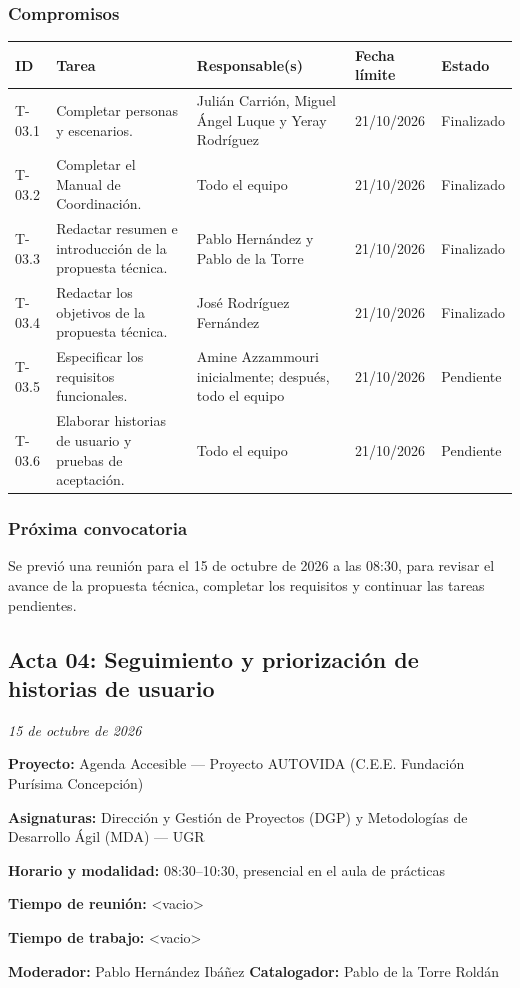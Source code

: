\subsubsection{Compromisos}
\begin{center}\footnotesize
\begin{tabularx}{\textwidth}{@{}p{}X p{}p{}p{}@{}}
\toprule
\rowcolor{tableHeader} ID & Tarea & Responsable(s) & Fecha límite & Estado \\
\midrule
T-03.1 & Completar personas y escenarios. & Julián Carrión, Miguel Ángel Luque y Yeray Rodríguez & 21/10/2026 & Finalizado \\
T-03.2 & Completar el Manual de Coordinación. & Todo el equipo & 21/10/2026 & Finalizado \\
T-03.3 & Redactar resumen e introducción de la propuesta técnica. & Pablo Hernández y Pablo de la Torre & 21/10/2026 & Finalizado \\
T-03.4 & Redactar los objetivos de la propuesta técnica. & José Rodríguez Fernández & 21/10/2026 & Finalizado \\
T-03.5 & Especificar los requisitos funcionales. & Amine Azzammouri inicialmente; después, todo el equipo & 21/10/2026 & Pendiente \\
T-03.6 & Elaborar historias de usuario y pruebas de aceptación. & Todo el equipo & 21/10/2026 & Pendiente \\
\bottomrule
\end{tabularx}
\end{center}

\subsubsection{Próxima convocatoria}
Se previó una reunión para el 15 de octubre de 2026 a las 08:30, para revisar el avance de la propuesta técnica, completar los requisitos y continuar las tareas pendientes.

\clearpage
\subsection{Acta 04: Seguimiento y priorización de historias de usuario}
\textcolor{textGray}{\textit{15 de octubre de 2026}}

\begin{infobox}[title=Datos de la reunión]
\textbf{Proyecto:} Agenda Accesible --- Proyecto AUTOVIDA (C.E.E. Fundación Purísima Concepción)\par
\textbf{Asignaturas:} Dirección y Gestión de Proyectos (DGP) y Metodologías de Desarrollo Ágil (MDA) --- UGR\par
\textbf{Horario y modalidad:} 08:30--10:30, presencial en el aula de prácticas\par
\textbf{Tiempo de reunión:} <vacio>\par
\textbf{Tiempo de trabajo:} <vacio>\par
\textbf{Moderador:} Pablo Hernández Ibáñez\qquad
\textbf{Catalogador:} Pablo de la Torre Roldán
\end{infobox}

